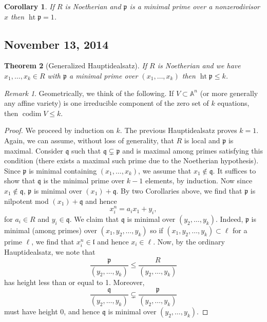 \documentclass{article}
\newcommand{\fr}{\mathfrak}
\newcommand{\A}{\mathbb{A}}
\DeclareMathOperator{\codim}{codim}
\DeclareMathOperator{\hgt}{ht}
\theoremstyle{plain}
\newtheorem{thm}{Theorem}
\newtheorem{cor}[thm]{Corollary}
\theoremstyle{definition}
\theoremstyle{remark}
\newtheorem*{rem}{Remark}
\begin{document}
\begin{cor}
    If $R$ is Noetherian and $\fr p$ is a minimal prime over a nonzerodivisor $x$ then $\hgt\fr p=1$.
\end{cor}

\subsection*{November 13, 2014}

\begin{thm}[Generalized Hauptidealsatz]
    If $R$ is Noetherian and we have $x_1,\ldots,x_k\in R$ with $\fr p$ a minimal
    prime over $(x_1,\ldots,x_k)$ then $\hgt\fr p\leq k$.
\end{thm}

\begin{rem}
    Geometrically, we think of the following. If $V\subset\A^n$ (or more generally any affine
    variety) is one irreducible component of the zero set of $k$ equations, then
    $\codim V\leq k$.
\end{rem}

\begin{proof}
    We proceed by induction on $k$. The previous Hauptidealsatz proves $k=1$.
    Again, we can assume, without loss of generality, that $R$ is local and $\fr p$ is maximal.
    Consider $\fr q$ such that $\fr q\subsetneq \fr p$ and is maximal among primes satisfying
    this condition (there exists a maximal such prime due to the Noetherian hypothesis).
    Since $\fr p$ is minimal containing $(x_1,\ldots,x_k)$, we assume that $x_1\notin\fr q$.
    It suffices to show that $\fr q$ is the minimal prime over $k-1$ elements, by induction.
    Now since $x_1\notin\fr q$, $\fr p$ is minimal over $(x_1)+\fr q$. By two Corollaries above,
    we find that $\fr p$ is nilpotent mod $(x_1)+\fr q$ and hence
    \[x_i^n=a_ix_1+y_i,\]
    for $a_i\in R$ and $y_i\in\fr q$. We claim that $\fr q$ is minimal over $(y_2,\ldots,y_k)$.
    Indeed, $\fr p$ is minimal (among primes) over $(x_1,y_2,\ldots,y_k)$ so if $(x_1,y_2,\ldots,y_k)\subset\ell$
    for a prime $\ell$, we find that $x_i^n\in\fr l$ and hence $x_i\in\ell$. Now, by the
    ordinary Hauptidealsatz, we note that
    \[\frac{\fr p}{(y_2,\ldots,y_k)}\leq \frac{R}{(y_2,\ldots,y_k)}\]
    has height less than or equal to 1. Moreover,
    \[\frac{\fr q}{(y_2,\ldots,y_k)}\subsetneq\frac{\fr p}{(y_2,\ldots,y_k)}\]
    must have height 0, and hence $\fr q$ is minimal over $(y_2,\ldots,y_k)$.
\end{proof}
\end{document}
